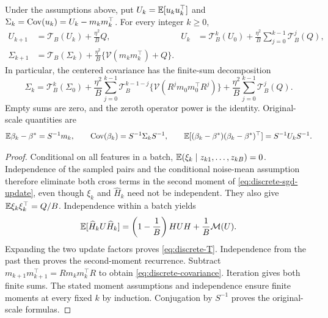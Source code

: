 \begin{proposition}
 \label{prop:discrete-moments}
 Under the assumptions above, put $U_k = \mathbb{E}[u_ku_k^\top]$ and
 $\Sigma_k = \operatorname{Cov}(u_k) = U_k - m_km_k^\top$. For every integer $k \ge 0$,
 \begin{align}
  U_{k+1}      & = \mathcal T_B(U_k) + \frac{\eta^2}{B}Q,                                                                   & U_k & = \mathcal T_B^k(U_0) + \frac{\eta^2}{B}\sum_{j=0}^{k-1}\mathcal T_B^j(Q), \label{eq:discrete-second} \\
  \Sigma_{k+1} & = \mathcal T_B(\Sigma_k) + \frac{\eta^2}{B}\{\mathcal V(m_km_k^\top) + Q\}. \label{eq:discrete-covariance}
 \end{align}
 In particular, the centered covariance has the finite-sum decomposition
 \begin{equation}
  \label{eq:discrete-covariance-sum}
  \Sigma_k
  = \mathcal T_B^k(\Sigma_0)
    + \frac{\eta^2}{B}\sum_{j=0}^{k-1} \mathcal T_B^{k-1-j}\{\mathcal V(R^jm_0m_0^\top R^j)\}
    + \frac{\eta^2}{B}\sum_{j=0}^{k-1}\mathcal T_B^j(Q).
 \end{equation}
 Empty sums are zero, and the zeroth operator power is the identity.
 Original-scale quantities are
 \begin{equation}
  \label{eq:discrete-original-moments}
  \mathbb{E}\beta_k - \beta^*
  = S^{-1}m_k,\qquad \operatorname{Cov}(\beta_k)
  = S^{-1}\Sigma_kS^{-1},\qquad \mathbb{E}[(\beta_k-\beta^*)(\beta_k-\beta^*)^\top]
  = S^{-1}U_kS^{-1}.
 \end{equation}
\end{proposition}
\begin{proof}
 Conditional on all features in a batch,
 $\mathbb{E}(\xi_k \mid z_{k1},\ldots,z_{kB}) = 0$. Independence of the sampled pairs
 and the conditional noise-mean assumption therefore eliminate both cross terms
 in the second moment of \eqref{eq:discrete-sgd-update}, even though $\xi_k$ and
 $\widehat H_k$ need not be independent. They also give
 $\mathbb{E}\xi_k\xi_k^\top = Q/B$. Independence within a batch yields
 \[
  \mathbb{E}[\widehat H_kU\widehat H_k] = \left( 1 - \frac1B \right)HUH
                                  + \frac1B\mathcal M(U).
 \]
 Expanding the two update factors proves \eqref{eq:discrete-T}. Independence
 from the past then proves the second-moment recurrence. Subtract
 $m_{k+1}m_{k+1}^\top = Rm_km_k^\top R$ to obtain
 \eqref{eq:discrete-covariance}. Iteration gives both finite sums. The stated
 moment assumptions and independence ensure finite moments at every fixed $k$ by
 induction. Conjugation by $S^{-1}$ proves the original-scale formulas.
\end{proof}

